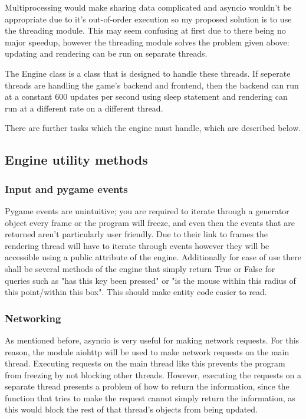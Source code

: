 \documentclass{report}
\begin{document}
Multiprocessing would make sharing data complicated and asyncio wouldn't be appropriate due to it's out-of-order execution so my proposed solution is to use the threading module. This may seem confusing at first due to there being no major speedup, however the threading module solves the problem given above: updating and rendering can be run on separate threads.

The Engine class is a class that is designed to handle these threads. If seperate threads are handling the game's backend and frontend, then the backend can run at a constant 600 updates per second using sleep statement and rendering can run at a different rate on a different thread. 

There are further tasks which the engine must handle, which are described below.

\subsection{Engine utility methods}

\subsubsection{Input and pygame events}

Pygame events are unintuitive; you are required to iterate through a generator object every frame or the program will freeze, and even then the events that are returned aren't particularly user friendly. Due to their link to frames the rendering thread will have to iterate through events however they will be accessible using a public attribute of the engine. Additionally for ease of use there shall be several methods of the engine that simply return True or False for queries such as "has this key been pressed" or "is the mouse within this radius of this point/within this box". This should make entity code easier to read.

\subsubsection{Networking}

As mentioned before, asyncio is very useful for making network requests. For this reason, the module aiohttp will be used to make network requests on the main thread. Executing requests on the main thread like this prevents the program from freezing by not blocking other threads. However, executing the requests on a separate thread presents a problem of how to return the information, since the function that tries to make the request cannot simply return the information, as this would block the rest of that thread's objects from being updated.
\end{document}
